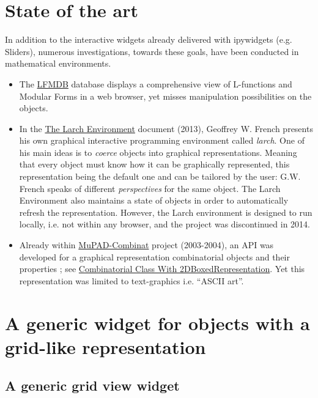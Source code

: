 \documentclass{deliverablereport}
\begin{document}
\section{State of the art}


In addition to the interactive widgets already delivered with ipywidgets (e.g. Sliders), numerous investigations, towards these goals, have been conducted in mathematical environments.

\begin{itemize}
\item The \href{http://www.lmfdb.org/}{LFMDB} database displays a comprehensive view of L-functions and Modular Forms in a web browser, yet misses manipulation possibilities on the objects.
\item In the \href{https://core.ac.uk/download/pdf/9839511.pdf}{The
  Larch Environment} document (2013), Geoffrey W. French presents his own graphical
  interactive programming environment called \emph{larch}.
  One of his main ideas is to
  \emph{coerce} objects into graphical representations. Meaning that
  every object must know how it can be graphically represented, this
  representation being the default one and can be tailored by the
  user: G.W. French speaks of different \emph{perspectives} for the
  same object. The Larch Environment also maintains a state of objects
  in order to automatically refresh the representation.
  However, the Larch environment is designed to run locally, i.e. not
  within any browser, and the project was discontinued in 2014.
\item Already within
  \href{http://mupad-combinat.sourceforge.net}{MuPAD-Combinat} project
  (2003-2004), an API was developed for a graphical representation
  combinatorial objects and their properties ; see
  \href{http://mupad-combinat.sourceforge.net/doc/en/Cat_Combinat/CombinatorialClassWith2DBoxedRepresentation.html}{Combinatorial
    Class With 2DBoxedRepresentation}. Yet this representation was
  limited to text-graphics i.e. ``ASCII art''.
\end{itemize}


\section{A generic widget for objects with a grid-like representation}
\label{grid}

\subsection{A generic grid view widget}
\end{document}
